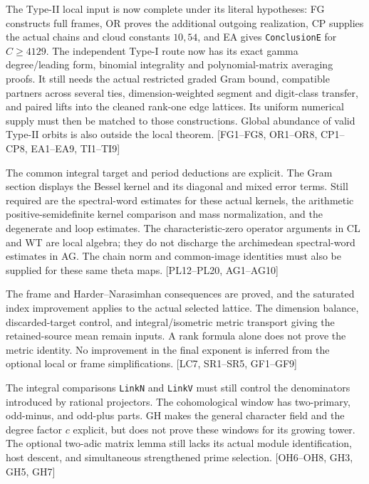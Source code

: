 \documentclass[11pt,a4paper]{article}
\numberwithin{equation}{section}
\theoremstyle{remark}\newtheorem{remark}[theorem]{Remark}
\begin{document}
\begin{description}[style=nextline]
\item[Complete the separate Type-I construction.]
The Type-II local input is now complete under its literal hypotheses: FG constructs full frames, OR proves the additional outgoing realization, CP supplies the actual chains and cloud constants $10,54$, and EA gives \texttt{ConclusionE} for $C\ge4129$. The independent Type-I route now has its exact gamma degree/leading form, binomial integrality and polynomial-matrix averaging proofs. It still needs the actual restricted graded Gram bound, compatible partners across several ties, dimension-weighted segment and digit-class transfer, and paired lifts into the cleaned rank-one edge lattices. Its uniform numerical supply must then be matched to those constructions. Global abundance of valid Type-II orbits is also outside the local theorem. \textsf{[FG1--FG8, OR1--OR8, CP1--CP8, EA1--EA9, TI1--TI9]}

\item[Theta identities, spectral estimates, and arithmetic kernel normalization.]
The common integral target and period deductions are explicit. The Gram section displays the Bessel kernel and its diagonal and mixed error terms. Still required are the spectral-word estimates for these actual kernels, the arithmetic positive-semidefinite kernel comparison and mass normalization, and the degenerate and loop estimates. The characteristic-zero operator arguments in CL and WT are local algebra; they do not discharge the archimedean spectral-word estimates in AG. The chain norm and common-image identities must also be supplied for these same theta maps. \textsf{[PL12--PL20, AG1--AG10]}

\item[Actual dimensions, metrics, and discarded target directions.]
The frame and Harder--Narasimhan consequences are proved, and the saturated index improvement applies to the actual selected lattice. The dimension balance, discarded-target control, and integral/isometric metric transport giving the retained-source mean remain inputs. A rank formula alone does not prove the metric identity. No improvement in the final exponent is inferred from the optional local or frame simplifications. \textsf{[LC7, SR1--SR5, GF1--GF9]}

\item[Congruence denominators and cohomological windows.]
The integral comparisons \texttt{LinkN} and \texttt{LinkV} must still control the denominators introduced by rational projectors. The cohomological window has two-primary, odd-minus, and odd-plus parts. GH makes the general character field and the degree factor $c$ explicit, but does not prove these windows for its growing tower. The optional two-adic matrix lemma still lacks its actual module identification, host descent, and simultaneous strengthened prime selection. \textsf{[OH6--OH8, GH3, GH5, GH7]}


\end{description}
\end{document}

